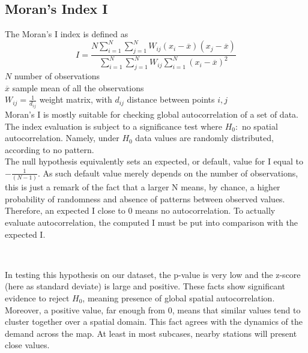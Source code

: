 \documentclass[12pt]{article}
\begin{document}
\subsection{Moran's Index I}
The Moran's I index is defined as 
$$
	I = \displaystyle{\frac{N\displaystyle\sum_{i=1}^{N} \sum_{j=1}^{N} W_{ij}(x_{i}-\overline{x})(x_{j}-\overline{x})}{\displaystyle\sum_{i=1}^{N}\sum_{j=1}^{N} W_{ij}\displaystyle\sum_{i=1}^{N} (x_{i}-\overline{x})^2}}
$$
$N$ number of observations\\
$\overline{x}$ sample mean of all the observations\\
$W_{ij}=\textstyle\frac{1}{d_{ij}}$ weight matrix, with $d_{ij}$ distance between points $i,j$ \\

\noindent
Moran's I is mostly suitable for checking global autocorrelation of a set of data. The index evaluation is subject to a significance test where $H_0 : $ no spatial autocorrelation. Namely, under $H_0$ data values are randomly distributed, according to no pattern.\\

\noindent
The null hypothesis equivalently sets an expected, or default, value for I equal to $\textstyle-\frac{1}{(N-1)}$.
As such default value merely depends on the number of observations, this is just a remark of the fact that a larger N means, by chance, a higher probability of randomness and absence of patterns between observed values. Therefore, an expected I close to 0 means no autocorrelation.
To actually evaluate autocorrelation, the computed I must be put into comparison with the expected I.

\begin{figure}[H]
\centering
{}\\
\end{figure}
\noindent
In testing this hypothesis on our dataset, the p-value is very low and the z-score (here as standard deviate) is large and positive. These facts show significant evidence to reject $H_0$, meaning presence of global spatial autocorrelation. 
Moreover, a positive value, far enough from 0, means that similar values tend to cluster together over a spatial domain. This fact agrees with the dynamics of the demand across the map. At least in most subcases, nearby stations will present close values.\\
\end{document}
